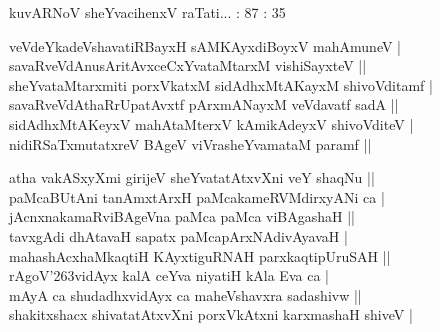 \begin{entry}
\gl{}
\info{}{}{}{}
\begin{shl}
kuvARNoV sheYvacihenxV raTati... : 87 : 35
\end{shl}
\end{entry}

\begin{entry}
\begin{shl}
veVdeYkadeVshavatiRBayxH sAMKAyxdiBoyxV mahAmuneV |\\
savaRveVdAnusAritAvxceCxYvataMtarxM vishiSayxteV ||\\
sheYvataMtarxmiti porxVkatxM sidAdhxMtAKayxM shivoVditamf |\\
savaRveVdAthaRrUpatAvxtf pArxmANayxM veVdavatf sadA ||\\
sidAdhxMtAKeyxV mahAtaMterxV kAmikAdeyxV shivoVditeV |\\
nidiRSaTxmutatxreV BAgeV viVrasheYvamataM paramf ||
\end{shl}
\end{entry}

\begin{entry}
\begin{shl}
atha vakASxyXmi girijeV sheYvatatAtxvXni veY shaqNu ||\\
paMcaBUtAni tanAmxtArxH paMcakameRVMdirxyANi ca |\\
jAcnxnakamaRviBAgeVna paMca paMca viBAgashaH ||\\
tavxgAdi dhAtavaH sapatx paMcapArxNAdivAyavaH |\\
mahashAcxhaMkaqtiH KAyxtiguRNAH parxkaqtipUruSAH ||\\
rAgoV{\char'263}vidAyx kalA ceYva niyatiH kAla Eva ca |\\
mAyA ca shudadhxvidAyx ca maheVshavxra sadashivw ||\\
shakitxshacx shivatatAtxvXni porxVkAtxni karxmashaH shiveV |
\end{shl}
\end{entry}

